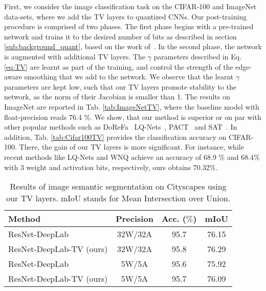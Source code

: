 \documentclass[reqno]{amsart}
\begin{document}
First, we consider the image classification task on the CIFAR-100 and ImageNet data-sets, where we add the TV layers to quantized CNNs. Our post-training procedure is comprised of two phases. The first phase begins with a pre-trained network and trains it to the desired number of bits as described in section \ref{sub:background_quant}, based on the work of~\cite{zhou2018adaptive}. In the second phase, the network is augmented with additional TV layers. The $\gamma$ parameters described in Eq. \eqref{eq:TV} are learnt as part of the training, and control the strength of the edge-aware smoothing that we add to the network. We observe that the learnt $\gamma$ parameters are kept low, such that our TV layers promote stability to the network, as the norm of their Jacobian is smaller than 1. The results on ImageNet are reported in Tab. \ref{tab:ImageNetTV}, where the baseline model with float-precision reads 76.4 $\%$. We show, that our method is superior or on par with other popular methods such as DoReFa~\cite{drfn} LQ-Nets~\cite{zhang2018lqnets}, PACT~\cite{choi2018pact} and SAT~\cite{jin2020scaleadjusted}. In addition, Tab. \ref{tab:Cifar100TV} provides the classification accuracy on CIFAR-100. There, the gain of our TV layers is more significant. For instance, while recent methods like LQ-Nets and WNQ achieve an accuracy of 68.9 $\%$ and 68.4$\%$ with 3 weight and activation bits, respectively, ours obtains 70.32$\%$. 

\begin{table}
    \centering
\begin{tabular}{lccc}
    \toprule
\bfseries Method & \bfseries Precision & \bfseries Acc. ($\%$) &  \bfseries mIoU \\
\midrule
    ResNet-DeepLab  & 32W/32A & 95.7 & 76.15 \\
    ResNet-DeepLab-TV (ours) & 32W/32A & 95.8 & 76.29 \\
    ResNet-DeepLab     & 5W/5A &  95.6 & 75.92 \\
    ResNet-DeepLab-TV (ours) & 5W/5A &  95.7 & 76.09 \\
    \bottomrule
\end{tabular}
    \caption{Results of image semantic segmentation on Cityscapes using our TV layers. mIoU stands for Mean Intersection over Union.}
    \label{tab:totalVariationSegmentation}
\end{table}
\end{document}
